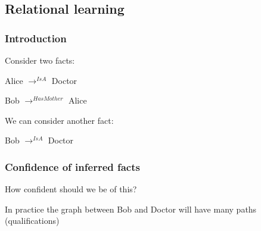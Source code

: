 \subsection{Relational learning}

\subsubsection{Introduction}

Consider two facts:

Alice \(\rightarrow^{IsA }\) Doctor

Bob \(\rightarrow^{HasMother }\) Alice

We can consider another fact:

Bob \(\rightarrow^{IsA }\) Doctor

\subsubsection{Confidence of inferred facts}

How confident should we be of this?

In practice the graph between Bob and Doctor will have many paths (qualifications)

